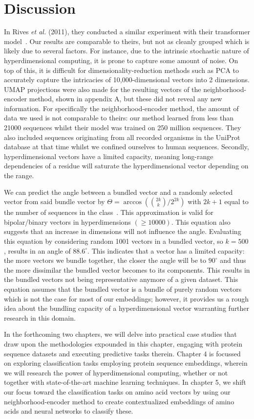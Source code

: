 \section{Discussion}
In Rives \textit{et al.} (2011), they conducted a similar experiment with their transformer model~\cite{esm1}. Our results are comparable to theirs, but not as cleanly grouped which is likely due to several factors. For instance, due to the intrinsic stochastic nature of hyperdimensional computing, it is prone to capture some amount of noise. On top of this, it is difficult for dimensionality-reduction methods such as PCA to accurately capture the intricacies of 10,000-dimensional vectors into 2 dimensions. UMAP projections were also made for the resulting vectors of the neighborhood-encoder method, shown in appendix A, but these did not reveal any new information. For specifically the neighborhood-encoder method, the amount of data we used is not comparable to theirs: our method learned from less than 21000 sequences whilst their model was trained on 250 million sequences. They also included sequences originating from all recorded organisms in the UniProt database at that time whilst we confined ourselves to human sequences. Secondly, hyperdimensional vectors have a limited capacity, meaning long-range dependencies of a residue will saturate the hyperdimensional vector depending on the range.

We can predict the angle between a bundled vector and a randomly selected vector from said bundle vector by $\Theta = \arccos({2k \choose k}/2^{2k})$ with $2k+1$ equal to the number of sequences in the class~\cite{sathdv}. This approximation is valid for bipolar/binary vectors in hyperdimensions $(\ge 10000)$. This equation also suggests that an increase in dimensions will not influence the angle. Evaluating this equation by considering random 1001 vectors in a bundled vector, so $k = 500$, results in an angle of $88.6^{\circ}$. This indicates that a vector has a limited capacity: the more vectors we bundle together, the closer the angle will be to $90^{\circ}$ and thus the more dissimilar the bundled vector becomes to its components. This results in the bundled vectors not being representative anymore of a given dataset. This equation assumes that the bundled vector is a bundle of purely random vectors which is not the case for most of our embeddings; however, it provides us a rough idea about the bundling capacity of a hyperdimensional vector warranting further research in this domain.

In the forthcoming two chapters, we will delve into practical case studies that draw upon the methodologies expounded in this chapter, engaging with protein sequence datasets and executing predictive tasks therein. Chapter 4 is focussed on exploring classification tasks employing protein sequence embeddings, wherein we will research the power of hyperdimensional computing, whether or not together with state-of-the-art machine learning techniques. In chapter 5, we shift our focus toward the classification tasks on amino acid vectors by using our neighborhood-encoder method to create contextualized embeddings of amino acids and neural networks to classify these.